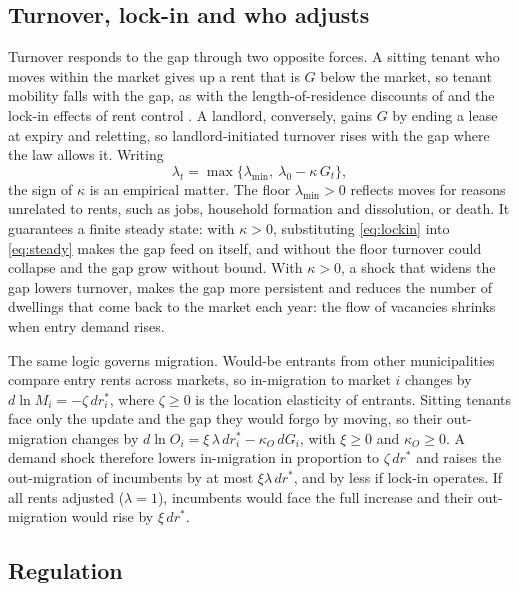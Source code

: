 \documentclass[11pt,a4paper]{article}
\begin{document}
\subsection{Turnover, lock-in and who adjusts}

Turnover responds to the gap through two opposite forces. A sitting tenant who moves within the market gives up a rent that is $G$ below the market, so tenant mobility falls with the gap, as with the length-of-residence discounts of \citet{goodman1985} and the lock-in effects of rent control \citep{glaeser2003,sims2007,diamond2019}. A landlord, conversely, gains $G$ by ending a lease at expiry and reletting, so landlord-initiated turnover rises with the gap where the law allows it. Writing
\begin{equation}\label{eq:lockin}
\lambda_t=\max\{\lambda_{\min},\ \lambda_0-\kappa\,G_t\},
\end{equation}
the sign of $\kappa$ is an empirical matter. The floor $\lambda_{\min}>0$ reflects moves for reasons unrelated to rents, such as jobs, household formation and dissolution, or death. It guarantees a finite steady state: with $\kappa>0$, substituting \eqref{eq:lockin} into \eqref{eq:steady} makes the gap feed on itself, and without the floor turnover could collapse and the gap grow without bound. With $\kappa>0$, a shock that widens the gap lowers turnover, makes the gap more persistent and reduces the number of dwellings that come back to the market each year: the flow of vacancies shrinks when entry demand rises.

The same logic governs migration. Would-be entrants from other municipalities compare entry rents across markets, so in-migration to market $i$ changes by $d\ln M_i=-\zeta\,dr^*_i$, where $\zeta\ge0$ is the location elasticity of entrants. Sitting tenants face only the update and the gap they would forgo by moving, so their out-migration changes by $d\ln O_i=\xi\,\lambda\,dr^*_i-\kappa_O\,dG_i$, with $\xi\ge0$ and $\kappa_O\ge0$. A demand shock therefore lowers in-migration in proportion to $\zeta\,dr^*$ and raises the out-migration of incumbents by at most $\xi\lambda\,dr^*$, and by less if lock-in operates. If all rents adjusted ($\lambda=1$), incumbents would face the full increase and their out-migration would rise by $\xi\,dr^*$.

\subsection{Regulation}
\end{document}
